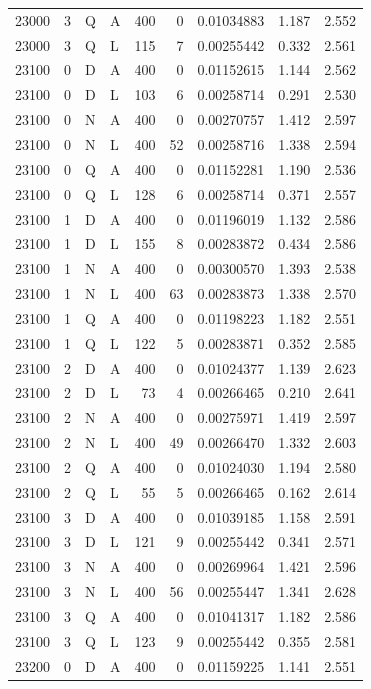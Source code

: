 \begin{longtable}{rrllrrrrr}
23000 & 3 & Q & A & 400 & 0 & 0.01034883 & 1.187 & 2.552\\
23000 & 3 & Q & L & 115 & 7 & 0.00255442 & 0.332 & 2.561\\
23100 & 0 & D & A & 400 & 0 & 0.01152615 & 1.144 & 2.562\\
23100 & 0 & D & L & 103 & 6 & 0.00258714 & 0.291 & 2.530\\
23100 & 0 & N & A & 400 & 0 & 0.00270757 & 1.412 & 2.597\\
23100 & 0 & N & L & 400 & 52 & 0.00258716 & 1.338 & 2.594\\
23100 & 0 & Q & A & 400 & 0 & 0.01152281 & 1.190 & 2.536\\
23100 & 0 & Q & L & 128 & 6 & 0.00258714 & 0.371 & 2.557\\
23100 & 1 & D & A & 400 & 0 & 0.01196019 & 1.132 & 2.586\\
23100 & 1 & D & L & 155 & 8 & 0.00283872 & 0.434 & 2.586\\
23100 & 1 & N & A & 400 & 0 & 0.00300570 & 1.393 & 2.538\\
23100 & 1 & N & L & 400 & 63 & 0.00283873 & 1.338 & 2.570\\
23100 & 1 & Q & A & 400 & 0 & 0.01198223 & 1.182 & 2.551\\
23100 & 1 & Q & L & 122 & 5 & 0.00283871 & 0.352 & 2.585\\
23100 & 2 & D & A & 400 & 0 & 0.01024377 & 1.139 & 2.623\\
23100 & 2 & D & L & 73 & 4 & 0.00266465 & 0.210 & 2.641\\
23100 & 2 & N & A & 400 & 0 & 0.00275971 & 1.419 & 2.597\\
23100 & 2 & N & L & 400 & 49 & 0.00266470 & 1.332 & 2.603\\
23100 & 2 & Q & A & 400 & 0 & 0.01024030 & 1.194 & 2.580\\
23100 & 2 & Q & L & 55 & 5 & 0.00266465 & 0.162 & 2.614\\
23100 & 3 & D & A & 400 & 0 & 0.01039185 & 1.158 & 2.591\\
23100 & 3 & D & L & 121 & 9 & 0.00255442 & 0.341 & 2.571\\
23100 & 3 & N & A & 400 & 0 & 0.00269964 & 1.421 & 2.596\\
23100 & 3 & N & L & 400 & 56 & 0.00255447 & 1.341 & 2.628\\
23100 & 3 & Q & A & 400 & 0 & 0.01041317 & 1.182 & 2.586\\
23100 & 3 & Q & L & 123 & 9 & 0.00255442 & 0.355 & 2.581\\
23200 & 0 & D & A & 400 & 0 & 0.01159225 & 1.141 & 2.551\\

\end{longtable}
